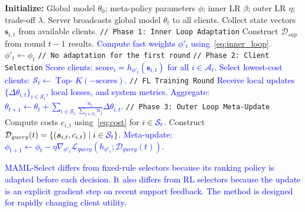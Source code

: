 \documentclass[journal]{IEEEtran}
\newcommand{\revision}[1]{\textcolor{blue}{#1}}
\begin{document}
\begin{algorithm}[!t]
	\vspace{0.5mm}
	\caption{\small MAML-Select Algorithm}
	\label{alg:maml_select}
	\begin{algorithmic}[1]
		\scriptsize
		\State \textbf{Initialize:} Global model $\theta_0$; meta-policy parameters $\phi$; inner LR $\beta$; outer LR $\eta$; trade-off $\lambda$.
		\State Server broadcasts global model $\theta_t$ to all clients.
		\State Collect state vectors $\bm{s}_{i,t}$ from available clients.
		\State \texttt{// Phase 1: Inner Loop Adaptation}
		\State Construct $\mathcal{D}_{sup}$ from round $t-1$ results.
			\State \revision{Compute fast weights $\phi'_t$ using~\eqref{eq:inner_loop}.}
		\Else
		\State $\phi'_t \leftarrow \phi_t$ \quad \texttt{// No adaptation for the first round}
		\EndIf
		\State \texttt{// Phase 2: Client Selection}
			\State \revision{Score clients: $\text{score}_i = h_{\phi'_t}(\bm{s}_{i,t})$ for all $i \in \mathcal{A}_t$.}
			\State \revision{Select lowest-cost clients: $\mathcal{S}_t \leftarrow \operatorname{Top-}K(-\text{scores})$.}
			\State \texttt{// FL Training Round}
				\State \revision{Receive local updates $\{\Delta\theta_{i,t}\}_{i \in \mathcal{S}_t}$, local losses, and system metrics.}
			\State \revision{Aggregate: $\theta_{t+1} \leftarrow \theta_t + \sum_{i \in \mathcal{S}_t} \frac{n_i}{\sum_{j \in \mathcal{S}_t}n_j}\Delta\theta_{i,t}$.}
			\State \texttt{// Phase 3: Outer Loop Meta-Update}
			\State Compute costs $c_{i,t}$ using~\eqref{eq:cost} for $i \in \revision{\mathcal{S}_t}$.
			\State Construct $\mathcal{D}_{query}(t) = \{(\bm{s}_{i,t}, c_{i,t}) \mid i \in \revision{\mathcal{S}_t}\}$.
				\State \revision{Meta-update: $\phi_{t+1} \leftarrow \phi_t - \eta \nabla_{\phi'_t} \mathcal{L}_{query}(h_{\phi'_t};\mathcal{D}_{query}(t))$.}
		\EndFor
	\end{algorithmic}
\end{algorithm}

\revision{MAML-Select differs from fixed-rule selectors because its ranking policy is adapted before each decision. It also differs from RL selectors because the update is an explicit gradient step on recent support feedback. The method is designed for rapidly changing client utility.}
\end{document}
